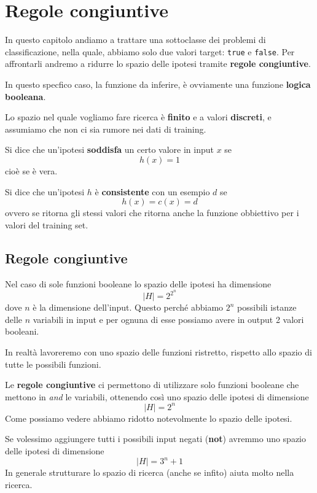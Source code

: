 \chapter{Regole congiuntive}
In questo capitolo andiamo a trattare una sottoclasse dei problemi di classificazione, nella quale, abbiamo solo due valori
target: \verb|true| e \verb|false|. Per affrontarli andremo a ridurre lo spazio delle ipotesi tramite
\textbf{regole congiuntive}.

In questo specfico caso, la funzione da inferire, \`e ovviamente una funzione \textbf{logica booleana}.

Lo spazio nel quale vogliamo fare ricerca \`e \textbf{finito} e a valori \textbf{discreti}, e assumiamo che non ci sia rumore
nei dati di training.

\begin{definition}
	Si dice che un'ipotesi \textbf{soddisfa} un certo valore in input $x$ se
	\[ h(x) = 1 \]
	cio\`e se \`e vera.
\end{definition}

\begin{definition}\label{def: consistente}
	Si dice che un'ipotesi $h$ \`e \textbf{consistente} con un esempio $d$ se
	\[ h(x) = c(x) = d \]
	ovvero se ritorna gli stessi valori che ritorna anche la funzione obbiettivo per i valori del training set.
\end{definition}

\section{Regole congiuntive}
Nel caso di sole funzioni booleane lo spazio delle ipotesi ha dimensione
\[ |H| = 2^{2^n} \]
dove $n$ \`e la dimensione dell'input. Questo perch\'e abbiamo $2^n$ possibili istanze delle $n$ variabili in input e
per ognuna di esse possiamo avere in output 2 valori booleani.

In realt\`a lavoreremo con uno spazio delle funzioni ristretto, rispetto allo spazio di tutte le
possibili funzioni.

Le \textbf{regole congiuntive} ci permettono di utilizzare solo funzioni booleane che mettono in \emph{and} le
variabili, ottenendo cos\`i uno spazio delle ipotesi di dimensione
\[ |H| = 2^n \]
Come possiamo vedere abbiamo ridotto notevolmente lo spazio delle ipotesi.

Se volessimo aggiungere tutti i possibili input negati (\textbf{not}) avremmo uno spazio delle ipotesi di dimensione
\[ |H| = 3^n + 1 \]
In generale strutturare lo spazio di ricerca (anche se infito) aiuta molto nella ricerca.

